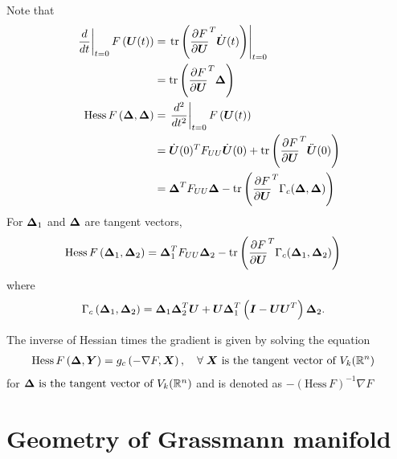 \documentclass[11pt]{article}
\begin{document}
Note that
\begin{align}
\left.{\frac{d}{dt}}\right\vert_{t=0}F\left(\boldsymbol{U}(t)\right)
&= \left.{\mathrm{tr}\left(\frac{\partial F}{ \partial \boldsymbol{U}}^{T}\dot{\boldsymbol{U}}(t) \right)}\right\vert_{t=0}\\
&= \mathrm{tr}\left(\frac{\partial F}{ \partial \boldsymbol{U}}^{T}\boldsymbol{\Delta} \right)\\
\text{Hess}\,F\left(\boldsymbol{\Delta}, \boldsymbol{\Delta}\right)&= \left.{\frac{d^{2}}{dt^{2}}}\right\vert_{t=0}F\left(\boldsymbol{U}(t)\right) \nonumber\\
&= \dot{\boldsymbol{U}}(0)^{T}F_{UU}\dot{\boldsymbol{U}}(0)+ \mathrm{tr}\left(\frac{\partial F}{ \partial \boldsymbol{U}}^{T}\ddot{\boldsymbol{U}}(0) \right)\nonumber\\
&= \boldsymbol{\Delta}^{T}F_{UU}\boldsymbol{\Delta}-  \mathrm{tr}\left(\frac{\partial F}{ \partial \boldsymbol{U}}^{T}\Gamma_{c}(\boldsymbol{\Delta}, \boldsymbol{\Delta})   \right) \label{eqn: Hessian_Stiefel}
\end{align} 
For $\boldsymbol{\Delta}_{1}$ and $\boldsymbol{\Delta}$ are tangent vectors, 
\begin{align}
\text{Hess}\,F\left(\boldsymbol{\Delta}_{1}, \boldsymbol{\Delta}_{2}\right)
&= \boldsymbol{\Delta}_{1}^{T}F_{UU}\boldsymbol{\Delta}_{2}-  \mathrm{tr}\left(\frac{\partial F}{ \partial \boldsymbol{U}}^{T}\Gamma_{c}(\boldsymbol{\Delta}_{1}, \boldsymbol{\Delta}_{2})   \right) \label{eqn: Hessian_Stiefel2}
\end{align} 
where
\begin{align}
\Gamma_{c}\left(\boldsymbol{\Delta}_{1}, \boldsymbol{\Delta}_{2} \right) 
&= \boldsymbol{\Delta}_{1}\boldsymbol{\Delta}_{2}^{T}\boldsymbol{U} +\boldsymbol{U}\boldsymbol{\Delta}_{1}^{T}\left( \boldsymbol{I} -\boldsymbol{U}\boldsymbol{U}^{T}  \right) \boldsymbol{\Delta}_{2}.
\nonumber
\end{align}

The inverse of Hessian times the gradient is given by solving the equation
\begin{align}
\text{Hess}\,F\left(\boldsymbol{\Delta}, \boldsymbol{Y}\right) &= g_{c}\left(-\nabla F, \boldsymbol{X}\right), \quad \forall \; \boldsymbol{X} \text{ is the tangent vector of } V_{k}({\mathbb R}^{n})
\end{align}
for $\boldsymbol{\Delta} \text{ is the tangent vector of } V_{k}({\mathbb R}^{n})$ and is denoted as $-(\text{Hess}\,F)^{-1}\nabla F$
 
\newpage
\section{Geometry of Grassmann manifold}
\end{document}
